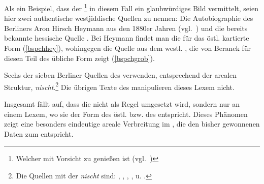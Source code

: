 {Als ein Beispiel, dass der \footnote{Welcher mit Vorsicht zu genießen ist (vgl.\, \citealt{GuggenheimGruenberg1966b})} in diesem Fall ein glaubwürdiges Bild vermittelt, seien hier zwei authentische westjiddische Quellen zu nennen: Die Autobiographie des Berliners Aron Hirsch Heymann aus den 1880er Jahren (vgl.\, \citealt{Schaefer2013}) und die bereits bekannte hessische Quelle . Bei Heymann findet man die für das östl. \hai{{\NWJ}} kartierte Form (\ref{bspchhey}), wohingegen die Quelle aus dem westl. , die von Beranek für diesen Teil des \hai{{\WJ}} übliche Form zeigt  (\ref{bspchgrob}).

 

  
Sechs der sieben Berliner Quellen des  verwenden, entsprechend der arealen Struktur, \textit{nischt}.\footnote{Die Quellen mit der  \textit{nischt} sind: , , , ,  u. .} Die übrigen Texte des  manipulieren dieses Lexem nicht.

 
Insgesamt fällt auf, dass die  nicht als Regel umgesetzt wird, sondern nur an einem Lexem, wo sie der Form des östl. \hai{{\WJ}} bzw. des \hai{{\OJ}} entspricht. Dieses Phänomen zeigt eine besonders eindeutige areale Verbreitung im \hai{{\LiJieins}}, die den bisher gewonnenen Daten zum \hai{{\WJ}} entspricht.

}

